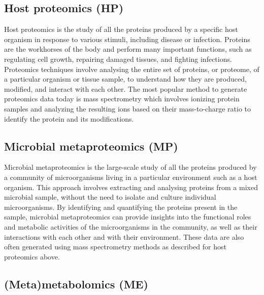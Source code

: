 \documentclass[
]{book}
\begin{document}
\hypertarget{host-proteomics}{%
\subsection*{Host proteomics (HP)}\label{host-proteomics}}

Host proteomics is the study of all the proteins produced by a specific host organism in response to various stimuli, including disease or infection. Proteins are the workhorses of the body and perform many important functions, such as regulating cell growth, repairing damaged tissues, and fighting infections. Proteomics techniques involve analysing the entire set of proteins, or proteome, of a particular organism or tissue sample, to understand how they are produced, modified, and interact with each other. The most popular method to generate proteomics data today is mass spectrometry which involves ionizing protein samples and analyzing the resulting ions based on their mass-to-charge ratio to identify the protein and its modifications.

\hypertarget{microbial-metaproteomics}{%
\subsection*{Microbial metaproteomics (MP)}\label{microbial-metaproteomics}}

Microbial metaproteomics is the large-scale study of all the proteins produced by a community of microorganisms living in a particular environment such as a host organism. This approach involves extracting and analysing proteins from a mixed microbial sample, without the need to isolate and culture individual microorganisms. By identifying and quantifying the proteins present in the sample, microbial metaproteomics can provide insights into the functional roles and metabolic activities of the microorganisms in the community, as well as their interactions with each other and with their environment. These data are also often generated using mass spectrometry methods as described for host proteomics above.

\hypertarget{meta-metabolomics}{%
\subsection*{(Meta)metabolomics (ME)}\label{meta-metabolomics}}
\end{document}
